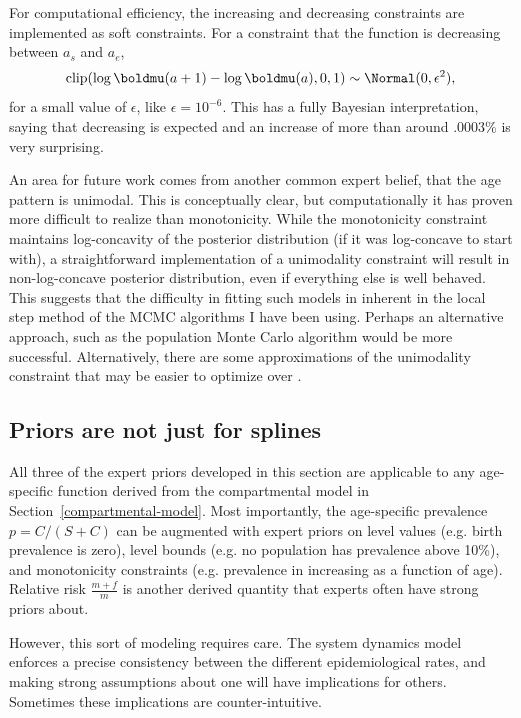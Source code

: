 For computational efficiency, the increasing and decreasing
constraints are implemented as soft constraints.  For a constraint
that the function is decreasing between $a_s$ and $a_e$,
\[
\operatorname{clip}(\log \boldmu(a+1) - \log \boldmu(a), 0, 1) \sim \Normal(0, \epsilon^2),
\]
for a small value of $\epsilon$, like $\epsilon = 10^{-6}$.  This has
a fully Bayesian interpretation, saying that decreasing is expected
and an increase of more than around .0003\% is very surprising.


An area for future work comes from another common expert belief, that
the age pattern is unimodal.  This is conceptually clear, but
computationally it has proven more difficult to realize than
monotonicity.  While the monotonicity constraint maintains
log-concavity of the posterior distribution (if it was log-concave to
start with), a straightforward implementation of a unimodality
constraint will result in non-log-concave posterior distribution, even
if everything else is well behaved.  This suggests that the difficulty
in fitting such models in inherent in the local step method of the
MCMC algorithms I have been using.  Perhaps an alternative approach,
such as the population Monte Carlo algorithm would be more successful.
Alternatively, there are some approximations of the unimodality
constraint that may be easier to optimize over \cite{Papp[KP6]]}.

\subsection{Priors are not just for splines}
All three of the expert priors developed in this section are
applicable to any age-specific function derived from the compartmental
model in Section~\ref{compartmental-model}. Most importantly, the
age-specific prevalence $p = C/(S+C)$ can be augmented with expert
priors on level values (e.g. birth prevalence is zero), level bounds
(e.g. no population has prevalence above 10\%), and monotonicity
constraints (e.g. prevalence in increasing as a function of
age). Relative risk $\frac{m+f}{m}$ is another derived quantity that
experts often have strong priors about.

However, this sort of modeling requires care. The system dynamics
model enforces a precise consistency between the different
epidemiological rates, and making strong assumptions about one will
have implications for others.  Sometimes these implications are
counter-intuitive.

